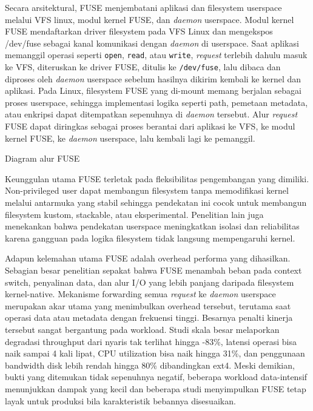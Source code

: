 Secara arsitektural, FUSE menjembatani aplikasi dan filesystem userspace melalui VFS linux, modul kernel FUSE, dan \textit{daemon} userspace. Modul kernel FUSE mendaftarkan driver filesystem pada VFS Linux dan mengekspos /dev/fuse sebagai kanal komunikasi dengan \textit{daemon} di userspace. Saat aplikasi memanggil operasi seperti \texttt{open}, \texttt{read}, atau \texttt{write}, \textit{request} terlebih dahulu masuk ke VFS, diteruskan ke driver FUSE, ditulis ke \texttt{/dev/fuse}, lalu dibaca dan diproses oleh \textit{daemon} userspace sebelum hasilnya dikirim kembali ke kernel dan aplikasi. Pada Linux, filesystem FUSE yang di-mount memang berjalan sebagai proses userspace, sehingga implementasi logika seperti path, pemetaan metadata, atau enkripsi dapat ditempatkan sepenuhnya di \textit{daemon} tersebut\cite{YanDefuse}. Alur \textit{request} FUSE dapat diringkas sebagai proses berantai dari aplikasi ke VFS, ke modul kernel FUSE, ke \textit{daemon} userspace, lalu kembali lagi ke pemanggil.

Diagram alur FUSE

Keunggulan utama FUSE terletak pada fleksibilitas pengembangan yang dimiliki. Non-privileged user dapat membangun filesystem tanpa memodifikasi kernel melalui antarmuka yang stabil sehingga pendekatan ini cocok untuk membangun filesystem kustom, stackable, atau eksperimental\cite{Zou2022UserLevel}. Penelitian lain juga menekankan bahwa pendekatan userspace meningkatkan isolasi dan reliabilitas karena gangguan pada logika filesystem tidak langsung mempengaruhi kernel\cite{ChoRFUSE}.

Adapun kelemahan utama FUSE adalah overhead performa yang dihasilkan. Sebagian besar penelitian sepakat bahwa FUSE menambah beban pada context switch, penyalinan data, dan alur I/O yang lebih panjang daripada filesystem kernel-native\cite{Holtrop2022LDPFUSE}. Mekanisme forwarding semua \textit{request} ke \textit{daemon} userspace merupakan akar utama yang menimbulkan overhead tersebut, terutama saat operasi data atau metadata dengan frekuensi tinggi\cite{Holtrop2022LDPFUSE}. Besarnya penalti kinerja tersebut sangat bergantung pada workload. Studi skala besar melaporkan degradasi throughput dari nyaris tak terlihat hingga -83\%, latensi operasi bisa naik sampai 4 kali lipat, CPU utilization bisa naik hingga 31\%, dan penggunaan bandwidth disk lebih rendah hingga 80\% dibandingkan ext4\cite{}. Meski demikian, bukti yang ditemukan tidak sepenuhnya negatif, beberapa workload data-intensif menunjukkan dampak yang kecil dan beberapa studi menyimpulkan FUSE tetap layak untuk produksi bila karakteristik bebannya disesuaikan\cite{ChoRFUSE}.

